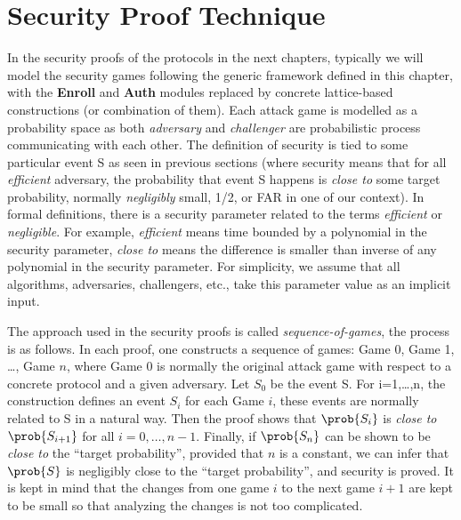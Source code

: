 \section{Security Proof Technique}
In the security proofs of the protocols in the next chapters, typically we will
model the security games following the generic framework defined in this
chapter, with the \textbf{Enroll} and \textbf{Auth} modules replaced by concrete
lattice-based constructions (or combination of them). Each attack game is
modelled as a probability space as both \textit{adversary} and
\textit{challenger} are probabilistic process communicating with each other. The
definition of security is tied to some particular event S as seen in previous
sections (where security means that for all \textit{efficient} adversary, the
probability that event S happens is \textit{close to} some target probability,
normally \textit{negligibly} small, 1/2, or FAR in one of our context). In
formal definitions, there is a security parameter related to the terms
\textit{efficient} or \textit{negligible}. For example, \textit{efficient} means
time bounded by a polynomial in the security parameter, \textit{close to} means
the difference is smaller than inverse of any polynomial in the security
parameter. For simplicity, we assume that all algorithms, adversaries,
challengers, etc., take this parameter value as an implicit input.

The approach used in the security proofs is called \textit{sequence-of-games},
the process is as follows. In each proof, one constructs a sequence of games:
Game 0, Game 1, \dots, Game $n$, where Game 0 is normally the original attack
game with respect to a concrete protocol and a given adversary. Let $S_{0}$ be
the event S. For i=1,\dots,n, the construction defines an event $S_{i}$ for each
Game $i$, these events are normally related to S in a natural way. Then the
proof shows that $\prob{S_{i}}$ is \textit{close to} $\prob{S_{i+1}}$ for all
$i=0,\dots,n-1$. Finally, if $\prob{S_{n}}$ can be shown to be \textit{close to}
the ``target probability'', provided that $n$ is a constant, we can infer that
$\prob{S}$ is negligibly close to the ``target probability'', and security is
proved. It is kept in mind that the changes from one game $i$ to the next game
$i+1$ are kept to be small so that analyzing the changes is not too complicated.

